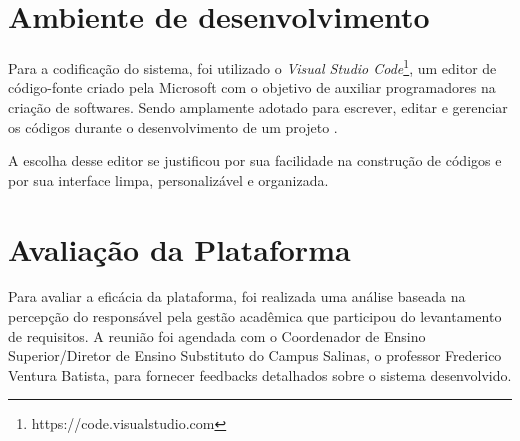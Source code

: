 \section{Ambiente de desenvolvimento}

Para a codificação do sistema, foi utilizado o \textit{Visual Studio Code}\footnote{https://code.visualstudio.com}, um editor de código-fonte criado pela Microsoft com o objetivo de auxiliar programadores na criação de softwares. Sendo amplamente adotado para escrever, editar e gerenciar os códigos durante o desenvolvimento de um projeto \cite{silva2024biblioteca}.

A escolha desse editor se justificou por sua facilidade na construção de códigos e por sua interface limpa, personalizável e organizada.

\section{Avaliação da Plataforma}

Para avaliar a eficácia da plataforma, foi realizada uma análise baseada na percepção do responsável pela gestão acadêmica que participou do levantamento de requisitos. A reunião foi agendada com o Coordenador de Ensino Superior/Diretor de Ensino Substituto do Campus Salinas, o professor Frederico Ventura Batista, para fornecer feedbacks detalhados sobre o sistema desenvolvido.

